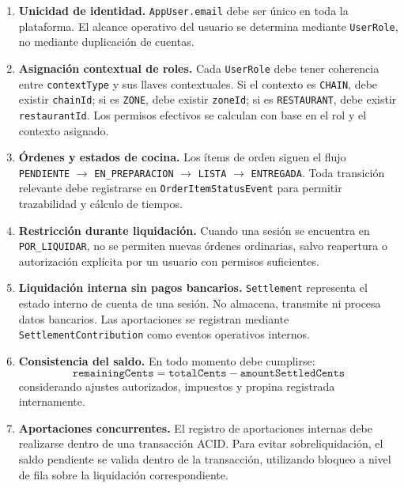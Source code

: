 \begin{enumerate}
  \item \textbf{Unicidad de identidad.}
  \texttt{AppUser.email} debe ser único en toda la plataforma. El alcance operativo del
  usuario se determina mediante \texttt{UserRole}, no mediante duplicación de cuentas.

  \item \textbf{Asignación contextual de roles.}
  Cada \texttt{UserRole} debe tener coherencia entre \texttt{contextType} y sus llaves
  contextuales. Si el contexto es \texttt{CHAIN}, debe existir \texttt{chainId}; si es
  \texttt{ZONE}, debe existir \texttt{zoneId}; si es \texttt{RESTAURANT}, debe existir
  \texttt{restaurantId}. Los permisos efectivos se calculan con base en el rol y el
  contexto asignado.

  \item \textbf{Órdenes y estados de cocina.}
  Los ítems de orden siguen el flujo \texttt{PENDIENTE} $\rightarrow$
  \texttt{EN\_PREPARACION} $\rightarrow$ \texttt{LISTA} $\rightarrow$
  \texttt{ENTREGADA}. Toda transición relevante debe registrarse en
  \texttt{OrderItemStatusEvent} para permitir trazabilidad y cálculo de tiempos.

  \item \textbf{Restricción durante liquidación.}
  Cuando una sesión se encuentra en \texttt{POR\_LIQUIDAR}, no se permiten nuevas órdenes
  ordinarias, salvo reapertura o autorización explícita por un usuario con permisos
  suficientes.

  \item \textbf{Liquidación interna sin pagos bancarios.}
  \texttt{Settlement} representa el estado interno de cuenta de una sesión. No almacena,
  transmite ni procesa datos bancarios. Las aportaciones se registran mediante
  \texttt{SettlementContribution} como eventos operativos internos.

  \item \textbf{Consistencia del saldo.}
  En todo momento debe cumplirse:
  \[
    \texttt{remainingCents} =
    \texttt{totalCents} - \texttt{amountSettledCents}
  \]
  considerando ajustes autorizados, impuestos y propina registrada internamente.

  \item \textbf{Aportaciones concurrentes.}
  El registro de aportaciones internas debe realizarse dentro de una transacción ACID.
  Para evitar sobreliquidación, el saldo pendiente se valida dentro de la transacción,
  utilizando bloqueo a nivel de fila sobre la liquidación correspondiente.


\end{enumerate}

